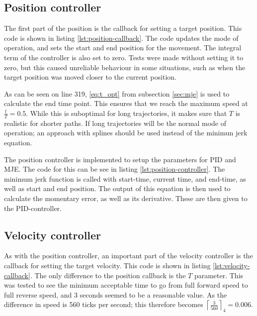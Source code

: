 \documentclass[11pt]{article}
\begin{document}
\subsection{Position controller}
The first part of the position is the callback for setting a target position. This code is shown in listing \vref{lst:position-callback}. The code updates the mode of operation, and sets the start and end position for the movement. The integral term of the controller is also set to zero. Tests were made without setting it to zero, but this caused unreliable behaviour in some situations, such as when the target position was moved closer to the current position. \par

As can be seen on line 319, \ref{eq:t_opt} from subsection \vref{sec:mje} is used to calculate the end time point. This ensures that we  reach the maximum speed at $\frac{t}{T} = 0.5$. While this is suboptimal for long trajectories, it makes sure that $T$ is realistic for shorter paths. If long trajectories will be the normal mode of operation; an approach with splines should be used instead of the minimun jerk equation. \par
\newpage


The position controller is implemented to setup the parameters for PID and MJE. The code for this can be see in listing \vref{lst:position-controller}. The minimum jerk function is called with start-time, current time, and end-time, as well as start and end position. The output of this equation is then used to calculate the momentary error, as well as its derivative. These are then given to the PID-controller. \par



\subsection{Velocity controller}
As with the position controller, an important part of the velocity controller is the callback for setting the target velocity. This code is shown in listing \vref{lst:velocity-callback}. The only difference to the position callback is the $T$ parameter. This was tested to see the minimum acceptable time to go from full forward speed to full reverse speed, and 3 seconds seemed to be a reasonable value. As the difference in speed is 560 ticks per second; this therefore becomes $\left\lceil\frac{3}{560}\right\rceil _4 = 0.006$. \par
\end{document}
